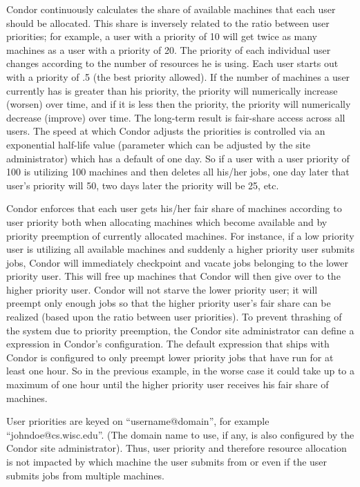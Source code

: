 Condor continuously calculates the share of available machines that each
user should be allocated.    This share is inversely related to the ratio
between user priorities; for example, a user with a priority of 10 will
get twice as many machines as a user with a priority of 20. The priority
of each individual user changes according to the number of resources he
is using. Each user starts out with a priority of .5 (the best
priority allowed).  If the number of machines a user currently has is greater than his
priority, the priority will numerically increase (worsen) over time, and if it is less then
the priority, the priority will numerically decrease (improve) over time. 
The long-term result is fair-share access across all users.  The speed
at which Condor adjusts the priorities is controlled via an exponential
half-life value (parameter  which can be adjusted
by the site administrator) which has a
default of one day.  So if a user with a user priority of 100 is
utilizing 100 machines and then deletes all his/her jobs, one day later that user's
priority will  50, two days later the priority will be 25, etc. 

Condor enforces that each user gets his/her fair share of machines
according to user priority both when allocating machines which become
available and by priority preemption of currently allocated machines.
For instance, if a low priority user is utilizing all available machines
and suddenly a higher priority user submits jobs, Condor will
immediately checkpoint and vacate jobs belonging to the lower priority
user. This will free up machines that Condor will then give over to the
higher priority user. Condor will not starve the lower priority user; it
will preempt only enough jobs so that the higher priority user's fair
share can be realized (based upon the ratio between user priorities). To
prevent thrashing of the system due to priority preemption, the Condor 
site administrator can define a  expression in Condor's configuration.
The default expression that ships with Condor is configured to only preempt 
lower priority jobs that have run
for at least one hour. So in the previous example, in the worse case it
could take up to a maximum of one hour until the higher priority user
receives his fair share of machines. 

User priorities are keyed on ``username@domain'', for example
``johndoe@cs.wisc.edu''. (The domain name to use, if any, is also configured by
the Condor site administrator).  Thus, user priority and therefore resource
allocation is not impacted by which machine the user submits from or
even if the user submits jobs from multiple machines.

